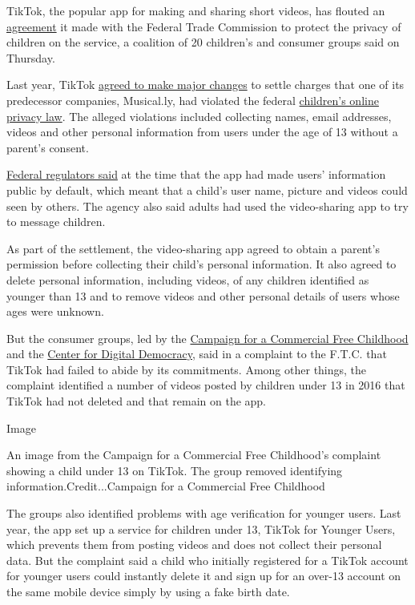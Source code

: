 TikTok, the popular app for making and sharing short videos, has flouted
an
\href{https://www.ftc.gov/system/files/documents/cases/musical.ly_proposed_order_ecf_2-27-19.pdf}{agreement}
it made with the Federal Trade Commission to protect the privacy of
children on the service, a coalition of 20 children's and consumer
groups said on Thursday.

Last year, TikTok
\href{https://www.nytimes.com/2019/02/27/technology/ftc-tiktok-child-privacy-fine.html}{agreed
to make major changes} to settle charges that one of its predecessor
companies, Musical.ly, had violated the federal
\href{https://www.ftc.gov/tips-advice/business-center/privacy-and-security/children\%27s-privacy}{children's
online privacy law}. The alleged violations included collecting names,
email addresses, videos and other personal information from users under
the age of 13 without a parent's consent.

\href{https://www.ftc.gov/news-events/press-releases/2019/02/video-social-networking-app-musically-agrees-settle-ftc}{Federal
regulators said} at the time that the app had made users' information
public by default, which meant that a child's user name, picture and
videos could seen by others. The agency also said adults had used the
video-sharing app to try to message children.

As part of the settlement, the video-sharing app agreed to obtain a
parent's permission before collecting their child's personal
information. It also agreed to delete personal information, including
videos, of any children identified as younger than 13 and to remove
videos and other personal details of users whose ages were unknown.

But the consumer groups, led by the
\href{https://commercialfreechildhood.org/}{Campaign for a Commercial
Free Childhood} and the \href{https://www.democraticmedia.org/}{Center
for Digital Democracy}, said in a complaint to the F.T.C. that TikTok
had failed to abide by its commitments. Among other things, the
complaint identified a number of videos posted by children under 13 in
2016 that TikTok had not deleted and that remain on the app.

Image

An image from the Campaign for a Commercial Free Childhood's complaint
showing a child under 13 on TikTok. The group removed identifying
information.Credit...Campaign for a Commercial Free Childhood

The groups also identified problems with age verification for younger
users. Last year, the app set up a service for children under 13, TikTok
for Younger Users, which prevents them from posting videos and does not
collect their personal data. But the complaint said a child who
initially registered for a TikTok account for younger users could
instantly delete it and sign up for an over-13 account on the same
mobile device simply by using a fake birth date.

